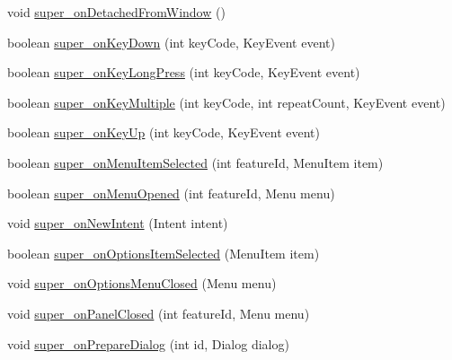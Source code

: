 \begin{DoxyCompactItemize}
\item 
void \hyperlink{classorg_1_1qtproject_1_1qt5_1_1android_1_1bindings_1_1_qt_activity_a103cd6d406de520a7c30fa31a704ee11}{super\-\_\-on\-Detached\-From\-Window} ()
\item 
boolean \hyperlink{classorg_1_1qtproject_1_1qt5_1_1android_1_1bindings_1_1_qt_activity_af7fbc3d78f28c7599fac81499717ac8d}{super\-\_\-on\-Key\-Down} (int key\-Code, Key\-Event event)
\item 
boolean \hyperlink{classorg_1_1qtproject_1_1qt5_1_1android_1_1bindings_1_1_qt_activity_ad723f98cf99880c9467f96f73fa25878}{super\-\_\-on\-Key\-Long\-Press} (int key\-Code, Key\-Event event)
\item 
boolean \hyperlink{classorg_1_1qtproject_1_1qt5_1_1android_1_1bindings_1_1_qt_activity_a108ba4840f9990f299beb44cced0a45d}{super\-\_\-on\-Key\-Multiple} (int key\-Code, int repeat\-Count, Key\-Event event)
\item 
boolean \hyperlink{classorg_1_1qtproject_1_1qt5_1_1android_1_1bindings_1_1_qt_activity_a0e236df83e1edd02ba8587199fc47e05}{super\-\_\-on\-Key\-Up} (int key\-Code, Key\-Event event)
\item 
boolean \hyperlink{classorg_1_1qtproject_1_1qt5_1_1android_1_1bindings_1_1_qt_activity_a054b8b51a53012f32a3d30bf395c18ca}{super\-\_\-on\-Menu\-Item\-Selected} (int feature\-Id, Menu\-Item item)
\item 
boolean \hyperlink{classorg_1_1qtproject_1_1qt5_1_1android_1_1bindings_1_1_qt_activity_ab1719c7260a5641289249620984077bd}{super\-\_\-on\-Menu\-Opened} (int feature\-Id, Menu menu)
\item 
void \hyperlink{classorg_1_1qtproject_1_1qt5_1_1android_1_1bindings_1_1_qt_activity_afb8a02b6c2e3c8e868f8cce113f50b18}{super\-\_\-on\-New\-Intent} (Intent intent)
\item 
boolean \hyperlink{classorg_1_1qtproject_1_1qt5_1_1android_1_1bindings_1_1_qt_activity_aab1ebb0d4fe4429af0b9e79a4a6295ad}{super\-\_\-on\-Options\-Item\-Selected} (Menu\-Item item)
\item 
void \hyperlink{classorg_1_1qtproject_1_1qt5_1_1android_1_1bindings_1_1_qt_activity_abd8ef4d5f57f3046c3065cbe806f690b}{super\-\_\-on\-Options\-Menu\-Closed} (Menu menu)
\item 
void \hyperlink{classorg_1_1qtproject_1_1qt5_1_1android_1_1bindings_1_1_qt_activity_a5f9ad8da2fcebff92ef8c86583091d75}{super\-\_\-on\-Panel\-Closed} (int feature\-Id, Menu menu)
\item 
void \hyperlink{classorg_1_1qtproject_1_1qt5_1_1android_1_1bindings_1_1_qt_activity_aacc652635f4bf45e2fa182dc44e8df13}{super\-\_\-on\-Prepare\-Dialog} (int id, Dialog dialog)

\end{DoxyCompactItemize}
